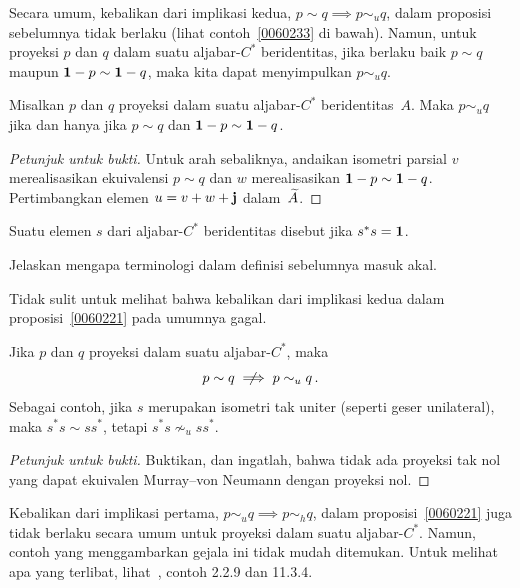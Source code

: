 Secara umum, kebalikan dari implikasi kedua, $p \sim q \implies p \sim_u q$, dalam proposisi sebelumnya tidak berlaku (lihat %
contoh~\ref{0060233} di bawah). Namun, untuk proyeksi $p$ dan $q$ dalam suatu aljabar-$C^*$ beridentitas, jika berlaku baik $p \sim q$ maupun
$\mathbf{1} - p \sim \mathbf{1} - q$, maka kita dapat menyimpulkan $p \sim_u q$.

\begin{prop}\label{0060224} Misalkan $p$ dan $q$ proyeksi dalam suatu aljabar-$C^*$ beridentitas~$A$. Maka $p \sim_u q$ jika dan hanya jika
$p \sim q$ dan $\mathbf{1} - p \sim \mathbf{1} - q$.
\end{prop}

\begin{proof}[\emph{Petunjuk untuk bukti}] Untuk arah sebaliknya, andaikan isometri parsial $v$ merealisasikan ekuivalensi $p \sim q$
dan $w$ merealisasikan $\mathbf{1} - p \sim \mathbf{1} - q$. Pertimbangkan elemen $u = v + w + \mathbf{j}$ dalam~$\widetilde{A}$.   \ns
\end{proof}

\begin{defn} Suatu elemen $s$ dari aljabar-$C^*$ beridentitas disebut
 jika $s^*s = \mathbf{1}$.
\end{defn}

\begin{exer} Jelaskan mengapa terminologi dalam definisi sebelumnya masuk akal.
\end{exer}

Tidak sulit untuk melihat bahwa kebalikan dari implikasi kedua dalam proposisi~\ref{0060221} pada umumnya gagal.

\begin{exam}\label{0060233} Jika $p$ dan $q$ proyeksi dalam suatu aljabar-$C^*$, maka
   \[ p \sim q \,\,\,\,\not\!\!\!\!\implies p \sim_u q\,. \]
Sebagai contoh, jika $s$ merupakan isometri tak uniter (seperti geser unilateral), maka $s^*s \sim ss^*$, tetapi $s^*s \nsim_u ss^*$.
\end{exam}

\begin{proof}[\emph{Petunjuk untuk bukti}] Buktikan, dan ingatlah, bahwa tidak ada proyeksi tak nol yang dapat ekuivalen Murray--von Neumann
dengan proyeksi nol.   \ns
\end{proof}

\begin{rem} Kebalikan dari implikasi pertama, $p \sim_u q \implies p \sim_h q$, dalam proposisi~\ref{0060221} juga tidak berlaku %
secara umum untuk proyeksi dalam suatu aljabar-$C^*$. Namun, contoh yang menggambarkan gejala ini tidak mudah ditemukan. Untuk melihat
apa yang terlibat, lihat~\cite{RordamLL:2000}, contoh 2.2.9 dan 11.3.4.
\end{rem}

